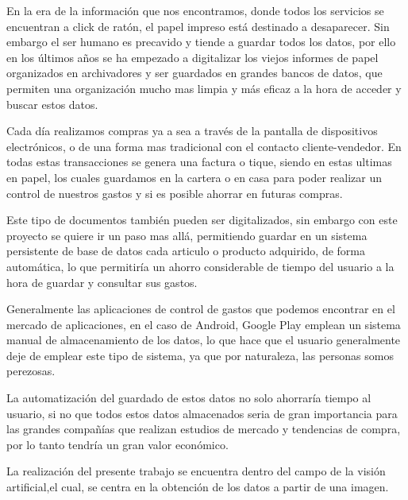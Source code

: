 
En la era de la información que nos encontramos, donde todos los servicios se encuentran a click de ratón, el papel impreso está destinado a desaparecer. Sin embargo el ser humano es precavido y tiende a guardar todos los datos, por ello en los últimos años se ha empezado a digitalizar  los viejos informes de papel organizados en archivadores y ser guardados en grandes bancos de datos, que permiten una organización mucho mas limpia y más eficaz a la hora de acceder y buscar estos datos.

 Cada día realizamos compras ya a sea a través de la pantalla de dispositivos electrónicos, o de una forma mas tradicional con el contacto cliente-vendedor. En todas estas transacciones se genera una factura o tique, siendo en estas ultimas en papel, los cuales guardamos en la cartera o en casa para poder realizar un control de nuestros gastos y si es posible ahorrar en futuras compras.
 
 Este tipo de documentos también pueden ser digitalizados, sin embargo con este proyecto se quiere ir un paso mas allá, permitiendo guardar en un sistema persistente de base de datos cada articulo o producto adquirido, de forma automática, lo que permitiría un ahorro considerable de tiempo del usuario a la hora de guardar y consultar sus gastos.
 
 Generalmente las aplicaciones de control de gastos que podemos encontrar en el mercado de aplicaciones, en el caso de Android, Google Play emplean un sistema manual de almacenamiento de los datos, lo que hace que el usuario generalmente deje de emplear este tipo de sistema, ya que por naturaleza, las personas somos perezosas.
 
 La automatización del guardado de estos datos no solo ahorraría tiempo al usuario, si no que todos estos datos almacenados seria de gran importancia para las grandes compañías que realizan estudios de mercado y tendencias de compra, por lo tanto tendría un gran valor económico.
 
 La realización del presente trabajo se encuentra  dentro del campo de la visión artificial,el cual, se centra en la obtención de los datos a partir de una imagen.
 
 
 
